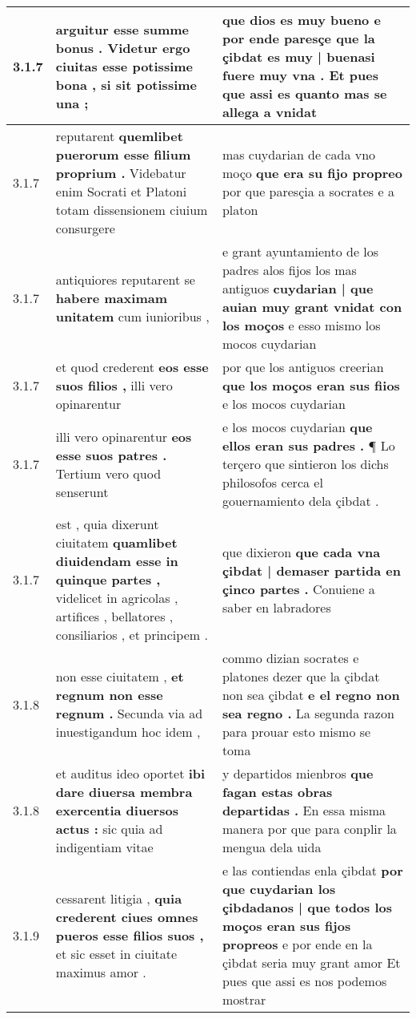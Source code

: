 \begin{tabular}{|p{1cm}|p{6.5cm}|p{6.5cm}|}
3.1.7 & arguitur esse summe bonus . \textbf{ Videtur ergo ciuitas esse potissime bona , } si sit potissime una ; & que dios es muy bueno \textbf{ e por ende paresçe que la çibdat es muy | buenasi fuere muy vna . } Et pues que assi es quanto mas se allega a vnidat \\\hline
3.1.7 & reputarent \textbf{ quemlibet puerorum esse filium proprium . } Videbatur enim Socrati et Platoni totam dissensionem ciuium consurgere & mas cuydarian de cada vno moço \textbf{ que era su fijo propreo } por que paresçia a socrates e a platon \\\hline
3.1.7 & antiquiores reputarent se \textbf{ habere maximam unitatem } cum iunioribus , & e grant ayuntamiento de los padres alos fijos los mas antiguos \textbf{ cuydarian | que auian muy grant vnidat con los moços } e esso mismo los mocos cuydarian \\\hline
3.1.7 & et quod crederent \textbf{ eos esse suos filios , } illi vero opinarentur & por que los antiguos creerian \textbf{ que los moços eran sus fiios } e los mocos cuydarian \\\hline
3.1.7 & illi vero opinarentur \textbf{ eos esse suos patres . } Tertium vero quod senserunt & e los mocos cuydarian \textbf{ que ellos eran sus padres . } ¶ Lo terçero que sintieron los dichs philosofos cerca el gouernamiento dela çibdat . \\\hline
3.1.7 & est , quia dixerunt ciuitatem \textbf{ quamlibet diuidendam esse in quinque partes , } videlicet in agricolas , artifices , bellatores , consiliarios , et principem . & que dixieron \textbf{ que cada vna çibdat | demaser partida en çinco partes . } Conuiene a saber en labradores \\\hline
3.1.8 & non esse ciuitatem , \textbf{ et regnum non esse regnum . } Secunda via ad inuestigandum hoc idem , & commo dizian socrates e platones dezer que la çibdat non sea çibdat \textbf{ e el regno non sea regno . } La segunda razon para prouar esto mismo se toma \\\hline
3.1.8 & et auditus ideo oportet \textbf{ ibi dare diuersa membra exercentia diuersos actus : } sic quia ad indigentiam vitae & y departidos mienbros \textbf{ que fagan estas obras departidas . } En essa misma manera por que para conplir la mengua dela uida \\\hline
3.1.9 & cessarent litigia , \textbf{ quia crederent ciues omnes pueros esse filios suos , } et sic esset in ciuitate maximus amor . & e las contiendas enla çibdat \textbf{ por que cuydarian los çibdadanos | que todos los moços eran sus fijos propreos } e por ende en la çibdat seria muy grant amor Et pues que assi es nos podemos mostrar \\\hline

\end{tabular}
